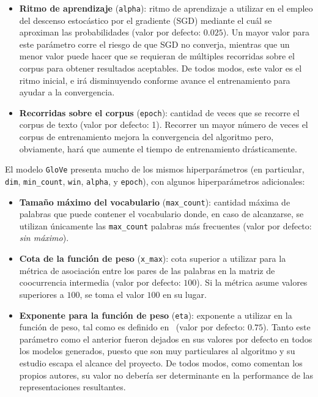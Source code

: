 \begin{itemize}
\item \textbf{Ritmo de aprendizaje} (\texttt{alpha}): ritmo de aprendizaje a utilizar en el empleo
del descenso estocástico por el gradiente (SGD) mediante el cuál se aproximan las probabilidades
(valor por defecto: $0.025$). Un mayor valor para este parámetro corre el riesgo de que SGD no
converja, mientras que un menor valor puede hacer que se requieran de múltiples recorridas sobre el
corpus para obtener resultados aceptables. De todos modos, este valor es el ritmo inicial, e irá
disminuyendo conforme avance el entrenamiento para ayudar a la convergencia.

\item \textbf{Recorridas sobre el corpus} (\texttt{epoch}): cantidad de veces que se recorre el
corpus de texto (valor por defecto: 1). Recorrer un mayor número de veces el corpus de entrenamiento
mejora la convergencia del algoritmo pero, obviamente, hará que aumente el tiempo de entrenamiento
drásticamente.

\end{itemize}

El modelo \texttt{GloVe} presenta mucho de los mismos hiperparámetros (en particular, \texttt{dim},
\texttt{min\_count}, \texttt{win}, \texttt{alpha}, y \texttt{epoch}), con algunos hiperparámetros
adicionales:

\begin{itemize}

\item \textbf{Tamaño máximo del vocabulario} (\texttt{max\_count}): cantidad máxima de palabras que
puede contener el vocabulario donde, en caso de alcanzarse, se utilizan únicamente las
\texttt{max\_count} palabras más frecuentes (valor por defecto: \textit{sin máximo}).

\item \textbf{Cota de la función de peso} (\texttt{x\_max}): cota superior a utilizar para la
métrica de asociación entre los pares de las palabras en la matriz de coocurrencia intermedia (valor
por defecto: $100$). Si la métrica asume valores superiores a $100$, se toma el valor $100$ en su
lugar.

\item \textbf{Exponente para la función de peso} (\texttt{eta}): exponente a utilizar en la función
de peso, tal como es definido en~\cite{Pennington2014} (valor por defecto: $0.75$). Tanto este
parámetro como el anterior fueron dejados en sus valores por defecto en todos los modelos generados,
puesto que son muy particulares al algoritmo y su estudio escapa el alcance del proyecto. De todos
modos, como comentan los propios autores, su valor no debería ser determinante en la performance de
las representaciones resultantes.

\end{itemize}

